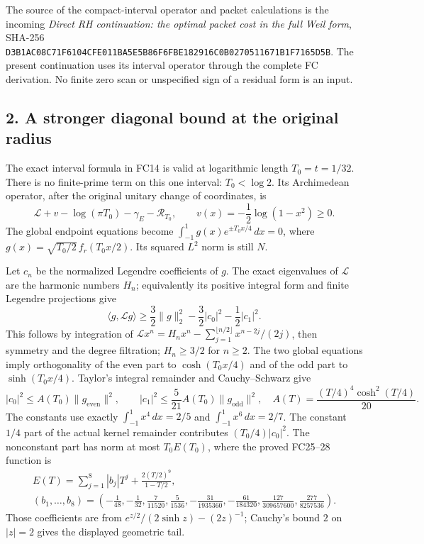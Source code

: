 \documentclass[
  10pt,
  a4paper,
]{article}
\begin{document}
The source of the compact-interval operator and packet calculations is
the incoming \emph{Direct RH continuation: the optimal packet cost in
the full Weil form}, SHA-256
\texttt{D3B1AC08\allowbreak{}C71F6104\allowbreak{}CFE011BA\allowbreak{}5E5B86F6\allowbreak{}FBE18291\allowbreak{}6C0B0270\allowbreak{}511671B1\allowbreak{}F7165D5B}.
The present continuation uses its interval operator through the complete
FC derivation. No finite zero scan or unspecified sign of a residual
form is an input.

\subsection{2. A stronger diagonal bound at the original
radius}\label{a-stronger-diagonal-bound-at-the-original-radius}

The exact interval formula in FC14 is valid at logarithmic length
\(T_0=t=1/32\). There is no finite-prime term on this one interval:
\(T_0<\log2\). Its Archimedean operator, after the original unitary
change of coordinates, is \[
 \mathcal L+v-\log(\pi T_0)-\gamma_E-\mathcal R_{T_0},
 \qquad v(x)=-\frac12\log(1-x^2)\ge0.
 \tag{FP6}
\] The global endpoint equations become
\(\int_{-1}^1g(x)e^{\pm T_0x/4}\,dx=0\), where
\(g(x)=\sqrt{T_0/2}\,f_r(T_0x/2)\). Its squared \(L^2\) norm is still
\(N\).

Let \(c_n\) be the normalized Legendre coefficients of \(g\). The exact
eigenvalues of \(\mathcal L\) are the harmonic numbers \(H_n\);
equivalently its positive integral form and finite Legendre projections
give \[
 \langle g,\mathcal Lg\rangle
 \ge\frac32\|g\|_2^2-\frac32|c_0|^2-\frac12|c_1|^2.
 \tag{FP7}
\] This follows by integration of
\(\mathcal Lx^n=H_nx^n-\sum_{j=1}^{\lfloor n/2\rfloor}x^{n-2j}/(2j)\),
then symmetry and the degree filtration; \(H_n\ge3/2\) for \(n\ge2\).
The two global equations imply orthogonality of the even part to
\(\cosh(T_0x/4)\) and of the odd part to \(\sinh(T_0x/4)\). Taylor's
integral remainder and Cauchy--Schwarz give \[
 |c_0|^2\le A(T_0)\|g_{\mathrm{even}}\|^2,\qquad
 |c_1|^2\le\frac5{21}A(T_0)\|g_{\mathrm{odd}}\|^2,
 \quad A(T)=\frac{(T/4)^4\cosh^2(T/4)}{20}.
 \tag{FP8}
\] The constants use exactly \(\int_{-1}^1x^4\,dx=2/5\) and
\(\int_{-1}^1x^6\,dx=2/7\). The constant \(1/4\) part of the actual
kernel remainder contributes \((T_0/4)|c_0|^2\). The nonconstant part
has norm at most \(T_0E(T_0)\), where the proved FC25--28 function is \[
 \begin{gathered}
 E(T)=\sum_{j=1}^8|b_j|T^j+
          \frac{2(T/2)^9}{1-T/2},\\
 (b_1,\ldots,b_8)=
 \left(-\frac1{48},-\frac1{32},\frac7{11520},
 \frac5{1536},-\frac{31}{1935360},-\frac{61}{184320},
 \frac{127}{309657600},\frac{277}{8257536}\right).
 \end{gathered}
 \tag{FP9}
\] Those coefficients are from \(e^{z/2}/(2\sinh z)-(2z)^{-1}\);
Cauchy's bound \(2\) on \(|z|=2\) gives the displayed geometric tail.
\end{document}
